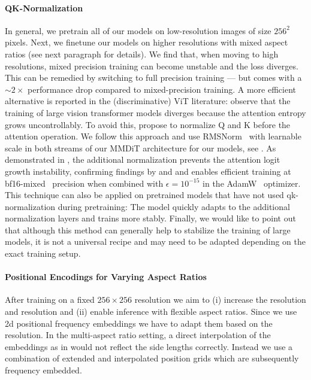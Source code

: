 \paragraph{QK-Normalization} 
In general, we pretrain all of our models on low-resolution images of size $256^2$ pixels. 
Next, we finetune our models on higher resolutions with mixed aspect ratios (see next paragraph for details). 
We find that, when moving to high resolutions, mixed precision training can become unstable and the loss diverges.
This can be remedied by switching to full precision training --- but comes with a $\sim 2\times$ performance drop compared to mixed-precision training. 
A more efficient alternative is reported in the (discriminative) ViT literature: \citet{dehghani2023scaling} observe that the training of large vision transformer models diverges because the attention entropy grows uncontrollably. To avoid this, \citet{dehghani2023scaling} propose to normalize Q and K before the attention operation. We follow this approach and use RMSNorm~\citep{zhang2019root} with learnable scale in both streams of our MMDiT architecture for our models, see .
As demonstrated in , the additional normalization prevents the attention logit growth instability, confirming findings by \citet{dehghani2023scaling} and \citet{wortsman2023smallscale} and enables efficient training at bf16-mixed~\citep{bfloat16} precision when combined with $\epsilon=10^{-15}$ in the AdamW~\citep{Loshchilov2017FixingWD} optimizer.
This technique can also be applied on pretrained models that have not used qk-normalization during pretraining: The model quickly adapts to the additional normalization layers and trains more stably. 
Finally, we would like to point out that although this method can generally help to stabilize the training of large models, it is not a universal recipe and may need to be adapted depending on the exact training setup.


\paragraph{Positional Encodings for Varying Aspect Ratios}
%
%
%
%
%
%
%
After training on a fixed $256\times256$ resolution we aim to (i) increase the
resolution and resolution and (ii) enable inference with flexible aspect
ratios. Since we use 2d positional frequency embeddings we have to adapt them
based on the resolution. In the multi-aspect ratio setting, a direct
interpolation of the embeddings as in \cite{dosovitskiy2020image} would not reflect the side
lengths correctly. Instead we use a combination of extended and interpolated
position grids which are subsequently frequency embedded.

